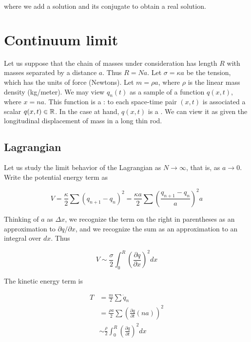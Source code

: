 where we add a solution and its conjugate to obtain a real solution.




\section{Continuum limit}

Let us suppose that the chain of masses under consideration has length $R$ with masses separated by a distance $a$.  Thus $R = Na$.  Let $\sigma = \kappa a$ be the tension, which has the units of force (Newtons).  Let $m = \rho a$, where $\rho$ is the linear mass density (kg/meter).  We may view $q_n(t)$ as a sample of a function $q(x,t)$, where $x = na$.  This function is a : to each space-time pair $(x,t)$ is associated a scalar $q(x,t) \in \Bbb{R}$. In the case at hand, $q(x,t)$ is a .  We can view it as given the longitudinal displacement of mass in a long thin rod. 

\subsection{Lagrangian}

Let us study the limit behavior of the Lagrangian as $N \to \infty$, that is, as $a \to 0$. Write the potential energy term as

\begin{equation}
V = \frac{\kappa}{2} \sum ( q_{n+1} - q_n )^2 
 = \frac{\kappa a}{2} \sum 
\left( \frac{q_{n+1} - q_n}{a} \right)^2 a
\end{equation}

Thinking of $a$ as $\Delta x$, we recognize the term on the right in parentheses as an approximation to $\partial q/\partial x$, and we recognize the sum as an approximation to an integral over $dx$.  Thus

\begin{equation}
V \sim \frac{\sigma}{2}\int_0^R \left(\frac{\partial q}{\partial x} \right)^2 dx
\end{equation}

The kinetic energy term is

\begin{align}
T &= \frac{m}{2} \sum \dot q_n \\
&= \frac{\rho a}{2} \sum \left(  \frac{\partial q}{\partial t} (na) \right)^2 \\
&\sim \frac{\rho}{2} \int_0^R  \left(\frac{\partial q}{\partial t} \right)^2 dx
\end{align}

